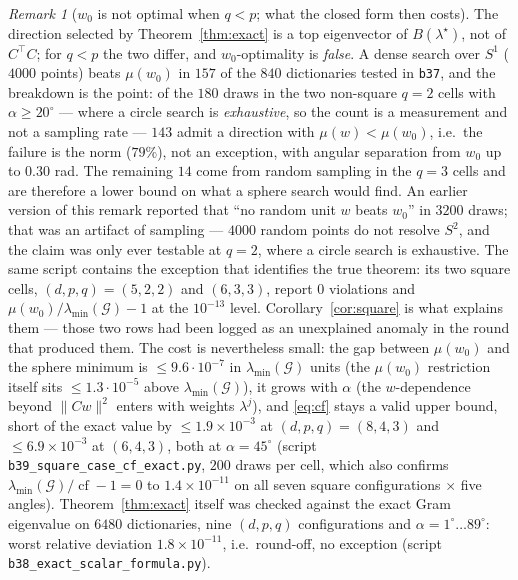 \documentclass[11pt]{article}
\theoremstyle{remark}
\newtheorem{remark}{Remark}[section]
\newcommand{\Gr}{\mathcal{G}}
\begin{document}
\begin{remark}[$w_0$ is not optimal when $q<p$; what the closed form then costs]
\label{rem:w0}
The direction selected by Theorem~\ref{thm:exact} is a top eigenvector of $B(\lambda^{\star})$, not
of $C^{\top}C$; for $q<p$ the two differ, and $w_0$-optimality is \emph{false}. A dense search over
$S^1$ ($4000$ points) beats $\mu(w_0)$ in $157$ of the $840$ dictionaries tested in \texttt{b37}, and the
breakdown is the point: of the $180$ draws in the two non-square $q=2$ cells with
$\alpha\ge20^\circ$ --- where a circle search is \emph{exhaustive}, so the count is a measurement and
not a sampling rate --- $143$ admit a direction with $\mu(w)<\mu(w_0)$, i.e.\ the failure is the norm
($79\%$), not an exception, with angular separation from $w_0$ up to $0.30$ rad. The remaining $14$
come from random sampling in the $q=3$ cells and are therefore a lower bound on what a sphere search
would find. An earlier version of this remark reported that ``no random unit $w$ beats $w_0$'' in
$3200$ draws; that was an artifact of sampling --- $4000$ random points do
not resolve $S^2$, and the claim was only ever testable at $q=2$, where a circle search is exhaustive.
The same script contains the exception that identifies the true theorem: its two square cells,
$(d,p,q)=(5,2,2)$ and $(6,3,3)$, report $0$ violations and
$\mu(w_0)/\lambda_{\min}(\Gr)-1$ at the $10^{-13}$ level. Corollary~\ref{cor:square} is what explains
them --- those two rows had been logged as an unexplained anomaly in the round that produced them.
The cost is nevertheless small: the gap between $\mu(w_0)$ and the sphere minimum is
$\le9.6\cdot10^{-7}$ in $\lambda_{\min}(\Gr)$ units (the $\mu(w_0)$ restriction itself sits
$\le1.3\cdot10^{-5}$ above $\lambda_{\min}(\Gr)$), it grows
with $\alpha$ (the $w$-dependence beyond $\|Cw\|^2$ enters with weights $\lambda^j$), and
\eqref{eq:cf} stays a valid upper bound, short of the exact value by $\le1.9\times10^{-3}$ at
$(d,p,q)=(8,4,3)$ and $\le6.9\times10^{-3}$ at $(6,4,3)$, both at $\alpha=45^\circ$
(script \texttt{b39\_square\_case\_cf\_exact.py}, $200$ draws per cell, which also confirms
$\lambda_{\min}(\Gr)/\operatorname{cf}-1=0$ to $1.4\times10^{-11}$ on all seven square configurations
$\times$ five angles). Theorem~\ref{thm:exact} itself was checked against the exact Gram eigenvalue
on $6480$ dictionaries, nine $(d,p,q)$ configurations and $\alpha=1^\circ\ldots89^\circ$: worst
relative deviation $1.8\times10^{-11}$, i.e.\ round-off, no exception (script
\texttt{b38\_exact\_scalar\_formula.py}).
\end{remark}
\end{document}
